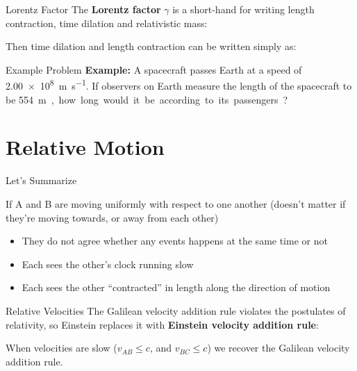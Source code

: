 \documentclass[12pt,compress,aspectratio=169]{beamer}
\newcommand{\bigsqrt}{\ensuremath\sqrt{1-\left(\dfrac vc\right)^2}}
\newcommand{\lorentz}{\ensuremath\frac1\bigsqrt}
\begin{document}
\begin{frame}{Lorentz Factor}
  The \textbf{Lorentz factor} $\gamma$ is a short-hand for writing length
  contraction, time dilation and relativistic mass:
  
  \eq{-.1in}{
    \boxed{\gamma=\lorentz}
  }
  Then time dilation and length contraction can be written simply as:
  
\end{frame}



\begin{frame}{Example Problem}
  \textbf{Example:} A spacecraft passes Earth at a speed of
  \SI{2.00e8}{\metre\per\second}. If observers on Earth measure the length of
  the spacecraft to be \SI{554}\metre, how long would it be according to its
  passengers?
\end{frame}



\section{Relative Motion}

\begin{frame}{Let's Summarize}
  \begin{center}
  \end{center}
  If A and B are moving uniformly with respect to one another (doesn't matter
  if they're moving towards, or away from each other)
  \begin{itemize}
  \item They do not agree whether any events happens at the same time or not
  \item Each sees the other's clock running slow
  \item Each sees the other ``contracted'' in length along the direction of
    motion
  \end{itemize}
\end{frame}



\begin{frame}{Relative Velocities}
  The Galilean velocity addition rule violates the postulates of relativity, so
  Einstein replaces it with \textbf{Einstein velocity addition rule}:
  

  When velocities are slow ($v_{AB}\leq c$, and $v_{BC}\leq c$) we recover the
  Galilean velocity addition rule.
\end{frame}
\end{document}
